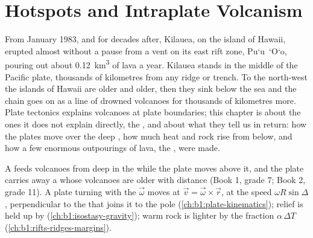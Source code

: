 \chapter{Hotspots and Intraplate Volcanism}\label{ch:b1:hotspots}

From January 1983, and for decades after, Kilauea, on the island of Hawaii,
erupted almost without a pause from a vent on its east rift zone,
Pu\textquoteleft u~\textquoteleft O\textquoteleft o, pouring out about
\qty{0.12}{km^3} of lava a year. Kilauea stands in the middle of the Pacific plate,
thousands of kilometres from any ridge or trench. To the north-west the
islands of Hawaii are older and older, then they sink below the sea and the
chain goes on as a line of drowned volcanoes for thousands of kilometres more.
Plate tectonics explains volcanoes at plate boundaries; this chapter is about
the ones it does not explain directly, the , and about what they tell
us in return: how the plates move over the deep , how much heat and rock
rise from below, and how a few enormous outpourings of lava, the , were made.

\begin{recall}
A  feeds volcanoes from deep in the  while the plate moves above
it, and the plate carries away a  whose volcanoes are older with
distance (Book 1, grade 7; Book 2, grade 11). A plate turning with the  $\vec\omega$ moves at $\vec v = \vec\omega\times\vec r$, at the speed
$\omega R\sin\Delta$, perpendicular to the  that joins it to the
pole (\cref{ch:b1:plate-kinematics}); relief is held up by 
(\cref{ch:b1:isostasy-gravity}); warm rock is lighter by the fraction
$\alpha\,\Delta T$ (\cref{ch:b1:rifts-ridges-margins}).
\end{recall}

